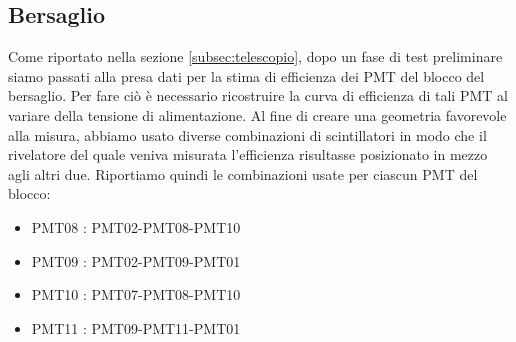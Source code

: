 \documentclass[10pt,a4paper]{article}
\begin{document}
\subsection{Bersaglio}\label{subsec:bersaglio}

\begin{flushleft}
Come riportato nella sezione \ref{subsec:telescopio}, dopo un fase di test preliminare siamo passati alla presa dati per la stima di efficienza dei PMT del blocco del bersaglio.
Per fare ciò è necessario ricostruire la curva di efficienza di tali PMT al variare della tensione di alimentazione. 
Al fine di creare una geometria favorevole alla misura, abbiamo usato diverse combinazioni di scintillatori in modo che il rivelatore del quale veniva misurata l'efficienza risultasse posizionato in mezzo agli altri due.
Riportiamo quindi le combinazioni usate per ciascun PMT del blocco:

\begin{itemize}

\item PMT08 : PMT02-PMT08-PMT10 
\item PMT09 : PMT02-PMT09-PMT01
\item PMT10 : PMT07-PMT08-PMT10
\item PMT11 : PMT09-PMT11-PMT01

\end{itemize}


\end{flushleft}
\end{document}
